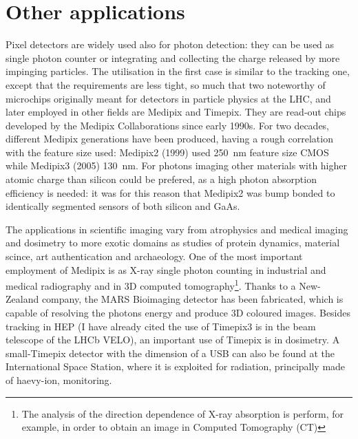 \section{Other applications}
    Pixel detectors are widely used also for photon detection: they can be used as single photon counter or integrating and collecting the charge released by more impinging particles. The utilisation in the first case is similar to the tracking one, except that the requirements are less tight, so much that two noteworthy of microchips originally meant for detectors in particle physics at the LHC, and later employed in other fields are Medipix and Timepix. They are read-out chips developed by the Medipix Collaborations since early 1990s. For two decades, different Medipix generations have been produced, having a rough correlation with the feature size used: Medipix2 (1999) used \SI{250}{nm} feature size CMOS while Medipix3 (2005) \SI{130}{nm}.
    For photons imaging other materials with higher atomic charge than silicon could be prefered, as a high photon absorption efficiency is needed: it was for this reason that Medipix2 was bump bonded to identically segmented sensors of both silicon and GaAs.
    
    The applications in scientific imaging vary from atrophysics and medical imaging and dosimetry to more exotic domains as studies of protein dynamics, material scince, art authentication and archaeology.
    One of the most important employment of Medipix is as X-ray single photon counting in industrial and medical radiography and in 3D computed tomography\footnote{The analysis of the direction dependence of X-ray absorption is perform, for example, in order to obtain an image in Computed Tomography (CT)}. Thanks to a New-Zealand company, the MARS Bioimaging detector has been fabricated, which is capable of resolving the photons energy and produce 3D coloured images.
    Besides tracking in HEP (I have already cited the use of Timepix3 is in the beam telescope of the LHCb VELO), an important use of Timepix is in dosimetry.
    A small-Timepix detector with the dimension of a USB can also be found at the International Space Station, where it is exploited for radiation, principally made of haevy-ion, monitoring. 
 

